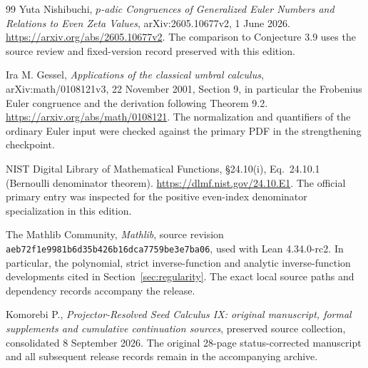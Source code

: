 \documentclass[11pt]{article}
\theoremstyle{definition}
\theoremstyle{remark}
\numberwithin{equation}{section}
\begin{document}
\clearpage
\appendix





\clearpage\def\IXMainAtlas{1}\def\AtlasFigDir{../../figures/worked}\clearpage
\begin{thebibliography}{99}
Yuta Nishibuchi,
\emph{$p$-adic Congruences of Generalized Euler Numbers and Relations to Even
Zeta Values}, arXiv:2605.10677v2, 1 June 2026.
\url{https://arxiv.org/abs/2605.10677v2}.
The comparison to Conjecture 3.9 uses the source review and fixed-version
record preserved with this edition.

Ira M. Gessel, \emph{Applications of the classical umbral calculus},
arXiv:math/0108121v3, 22 November 2001, Section 9, in particular the Frobenius Euler congruence and the derivation following Theorem 9.2.
\url{https://arxiv.org/abs/math/0108121}.
The normalization and quantifiers of the ordinary Euler input were checked against the primary PDF in the strengthening checkpoint.

NIST Digital Library of Mathematical Functions, \S24.10(i),
Eq.\ 24.10.1 (Bernoulli denominator theorem).
\url{https://dlmf.nist.gov/24.10.E1}. The official primary entry was inspected
for the positive even-index denominator specialization in this edition.

The Mathlib Community,
\emph{Mathlib}, source revision
\nolinkurl{aeb72f1e9981b6d35b426b16dca7759be3e7ba06},
used with Lean 4.34.0-rc2.
In particular, the polynomial, strict inverse-function and analytic
inverse-function developments cited in Section~\ref{sec:regularity}.
The exact local source paths and dependency records accompany the release.

Komorebi P.,
\emph{Projector-Resolved Seed Calculus IX: original manuscript, formal
supplements and cumulative continuation sources}, preserved source collection,
consolidated 8 September 2026.
The original 28-page status-corrected manuscript and all subsequent release
records remain in the accompanying archive.


\end{thebibliography}
\end{document}
